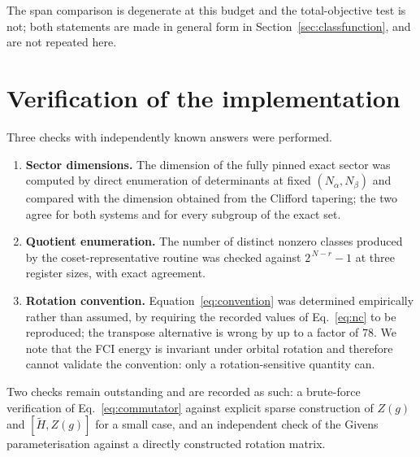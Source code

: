\documentclass[11pt]{article}
\newcommand{\Ht}{\widetilde H}
\begin{document}
The span comparison is degenerate at this budget and the total-objective
test is not; both statements are made in general form in
Section~\ref{sec:classfunction}, and are not repeated here.





\section{Verification of the implementation}
\label{sec:verification}

Three checks with independently known answers were performed.

\begin{enumerate}[leftmargin=1.8em,itemsep=2pt]
\item \textbf{Sector dimensions.} The dimension of the fully pinned exact
  sector was computed by direct enumeration of determinants at fixed
  $(N_\alpha,N_\beta)$ and compared with the dimension obtained from the
  Clifford tapering; the two agree for both systems and for every subgroup of
  the exact set.
\item \textbf{Quotient enumeration.} The number of distinct nonzero classes
  produced by the coset-representative routine was checked against
  $2^{\,N-r}-1$ at three register sizes, with exact agreement.
\item \textbf{Rotation convention.} Equation~\eqref{eq:convention} was
  determined empirically rather than assumed, by requiring the recorded values
  of Eq.~\eqref{eq:nc} to be reproduced; the transpose alternative is wrong by
  up to a factor of $78$. We note that the FCI energy is invariant under
  orbital rotation and therefore cannot validate the convention: only a
  rotation-sensitive quantity can.
\end{enumerate}

Two checks remain outstanding and are recorded as such: a brute-force
verification of Eq.~\eqref{eq:commutator} against explicit sparse construction
of $Z(g)$ and $[\Ht,Z(g)]$ for a small case, and an independent check of the
Givens parameterisation against a directly constructed rotation matrix.

\end{document}
